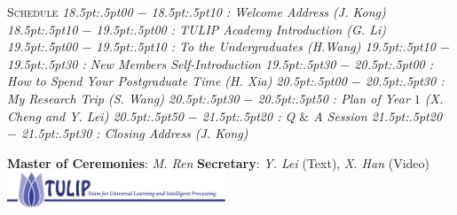 \documentclass{article}
\begin{document}
{\scshape  Schedule}
\textit{%
\footnotesize{
  18\kern.5pt:\kern.5pt00 $-$ 18\kern.5pt:\kern.5pt10 : Welcome Address (J. Kong)
  18\kern.5pt:\kern.5pt10 $-$ 19\kern.5pt:\kern.5pt00 : TULIP Academy Introduction (G. Li)
  19\kern.5pt:\kern.5pt00 $-$ 19\kern.5pt:\kern.5pt10 : To the Undergraduates (H.Wang)
  19\kern.5pt:\kern.5pt10 $-$ 19\kern.5pt:\kern.5pt30 : New Members Self-Introduction
  19\kern.5pt:\kern.5pt30 $-$ 20\kern.5pt:\kern.5pt00 : How to Spend Your Postgraduate Time (H. Xia)
  20\kern.5pt:\kern.5pt00 $-$ 20\kern.5pt:\kern.5pt30 : My Research Trip (S. Wang)
  20\kern.5pt:\kern.5pt30 $-$ 20\kern.5pt:\kern.5pt50 : Plan of Year $1$ (X. Cheng and Y. Lei)
  20\kern.5pt:\kern.5pt50 $-$ 21\kern.5pt:\kern.5pt20 : Q $\&$ A Session
  21\kern.5pt:\kern.5pt20 $-$ 21\kern.5pt:\kern.5pt30 : Closing Address (J. Kong)}
}

\smallbreak
{\scshape }
%
\smallbreak
\footnotesize{
\textbf{Master of Ceremonies}: \textit{M. Ren}
\textbf{Secretary}: \textit{Y. Lei} (Text), \textit{X. Han} (Video)
}
\smallbreak
\includegraphics[width=6.5cm]{logos/tulip-wordmark.eps}
\end{document}
